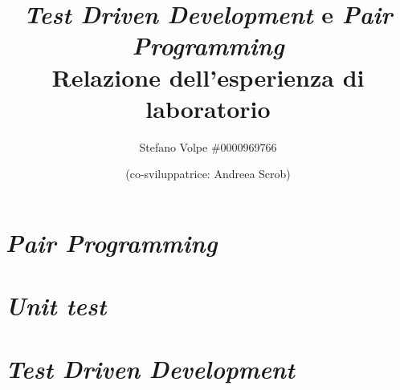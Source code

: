 \documentclass{article}
\title{
  \emph{Test Driven Development} e \emph{Pair Programming} \\
  \large{Relazione dell'esperienza di laboratorio}
}
\author{Stefano Volpe \#0000969766 \and (co-sviluppatrice: Andreea Scrob)}
\begin{document}
  \maketitle

  \section{\emph{Pair Programming}}
  \section{\emph{Unit test}}
  \section{\emph{Test Driven Development}}
\end{document}
